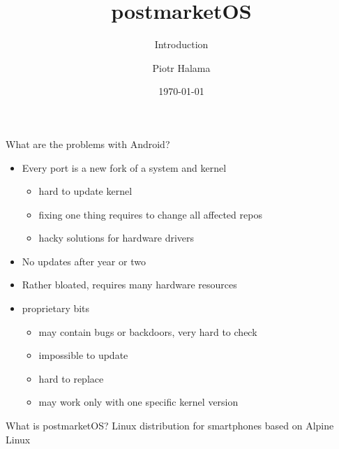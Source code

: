 \documentclass[aspectratio=169]{beamer}
\title{postmarketOS}
\subtitle{Introduction}
\author{Piotr Halama}
\date{\today}
\begin{document}
\frame{\titlepage}

\begin{frame}{What are the problems with Android?}
\begin{itemize}
	\item Every port is a new fork of a system and kernel
	\begin{itemize}
		\item hard to update kernel
		\item fixing one thing requires to change all affected repos
		\item hacky solutions for hardware drivers
	\end{itemize}
	\item No updates after year or two
	\item Rather bloated, requires many hardware resources
	\item proprietary bits
	\begin{itemize}
		\item may contain bugs or backdoors, very hard to check
		\item impossible to update
		\item hard to replace
		\item may work only with one specific kernel version
	\end{itemize}
\end{itemize}
\end{frame}

\begin{frame}{What is postmarketOS?}
	\center \Large Linux distribution for smartphones
	\center based on Alpine Linux
\end{frame}	
\end{document}
